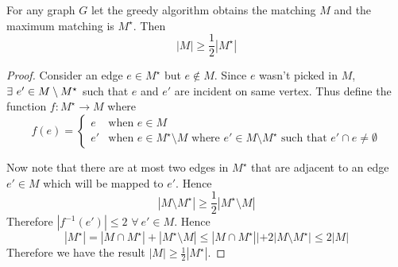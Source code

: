 \begin{Theorem}{}{}
	For any graph $G$ let the greedy algorithm obtains the matching $M$ and the maximum matching is $M^{\star}$. Then $$|M|\geq \frac12|M^\star|$$
\end{Theorem}
\begin{proof}
	Consider an edge $e\in M^{\star}$ but $e\notin M$. Since $e$ wasn't  picked in $M$, $\exists\ e'\in M\setminus M^{\star}$ such that $e$ and $e'$ are incident on same vertex. Thus define the function $f:M^{\star}\to M$ where $$f(e)=\begin{cases}
		e&\text{when $e\in M$}\\
		e' & \text{when $e\in M^{\star}\setminus M$ where $e'\in M\setminus M^{\star}$ such that $e'\cap e\neq \emptyset$}
	\end{cases}$$

Now note that there are at most  two edges in $M^{\star}$ that are adjacent to an edge $e'\in M$ which will be mapped to $e'$. Hence $$|M\setminus M^{\star}|\geq \frac12 |M^{\star}\setminus M|$$Therefore $|f^{-1}(e')|\leq 2$ $\forall\ e'\in M$. Hence $$|M^\star|=|M\cap M^{\star}|+|M^{\star}\setminus M|\leq |M\cap M^{\star}||+2|M\setminus M^{\star}|\leq 2|M|$$Therefore we have the result $|M|\geq \frac12|M^{\star}|$. 
\end{proof}
